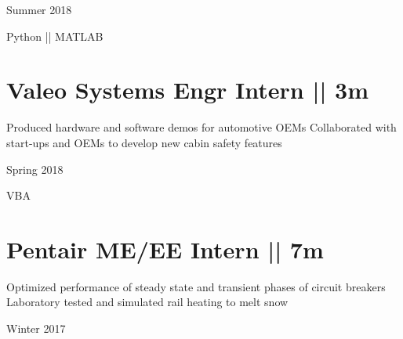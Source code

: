 \begin{subtitle}
\vspace{-7.8ex}
{{Summer 2018}}
\end{subtitle}
\vspace{0ex}

\vspace{-1.5ex}
{
\vspace{1.8ex}
\color{cyan}\small
{Python || MATLAB} %
}

\vspace{3.5ex}
\section
{\textbf{Valeo}
\newline
Systems Engr Intern || 3m}

\BulletItem
\vspace{-2.5ex}
\begin{detail}
\BulletItem
 Produced hardware and software demos for automotive OEMs
\BulletItem
 Collaborated with start-ups and OEMs to develop new cabin safety features
\end{detail}

\begin{subtitle}
\vspace{-7.8ex}
{{Spring 2018}}
\end{subtitle}

\vspace{-2ex}
{
\vspace{1.8ex}
\color{cyan}\small
{VBA} %
}

\vspace{3.5ex}
\section
{\textbf{Pentair}
\newline
ME/EE Intern  || 7m}

\BulletItem
\vspace{-2.5ex}
\begin{detail}

\BulletItem
 Optimized performance of steady state and transient phases of circuit breakers
\BulletItem
 Laboratory tested and simulated rail heating to melt snow
\end{detail}

\begin{subtitle}
\vspace{-7.8ex}
{{Winter 2017}}
\end{subtitle}
\vspace{0ex}

